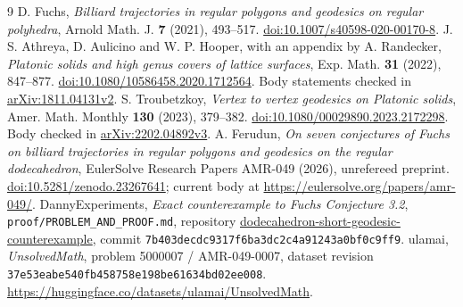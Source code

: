 \documentclass[11pt]{amsart}
\theoremstyle{remark}
\begin{document}
\begin{thebibliography}{9}
D. Fuchs, \emph{Billiard trajectories in regular polygons and geodesics on regular polyhedra},
Arnold Math. J. \textbf{7} (2021), 493--517.
\href{https://doi.org/10.1007/s40598-020-00170-8}{doi:10.1007/s40598-020-00170-8}.
J. S. Athreya, D. Aulicino and W. P. Hooper, with an appendix by A. Randecker,
\emph{Platonic solids and high genus covers of lattice surfaces},
Exp. Math. \textbf{31} (2022), 847--877.
\href{https://doi.org/10.1080/10586458.2020.1712564}{doi:10.1080/10586458.2020.1712564}.
Body statements checked in \href{https://arxiv.org/abs/1811.04131v2}{arXiv:1811.04131v2}.
S. Troubetzkoy, \emph{Vertex to vertex geodesics on Platonic solids},
Amer. Math. Monthly \textbf{130} (2023), 379--382.
\href{https://doi.org/10.1080/00029890.2023.2172298}{doi:10.1080/00029890.2023.2172298}.
Body checked in \href{https://arxiv.org/abs/2202.04892v3}{arXiv:2202.04892v3}.
A. Ferudun, \emph{On seven conjectures of Fuchs on billiard trajectories in regular polygons and geodesics on the regular dodecahedron},
EulerSolve Research Papers AMR-049 (2026), unrefereed preprint.
\href{https://doi.org/10.5281/zenodo.23267641}{doi:10.5281/zenodo.23267641};
current body at \url{https://eulersolve.org/papers/amr-049/}.
DannyExperiments, \emph{Exact counterexample to Fuchs Conjecture 3.2},
\texttt{proof/PROBLEM\_AND\_PROOF.md}, repository
\href{https://github.com/DannyExperiments/dodecahedron-short-geodesic-counterexample}{dodecahedron-short-geodesic-counterexample},
commit \texttt{7b403decdc9317f6ba3dc2c4a91243a0bf0c9ff9}.
ulamai, \emph{UnsolvedMath}, problem 5000007 / AMR-049-0007,
dataset revision \texttt{37e53eabe540fb458758e198be61634bd02ee008}.
\url{https://huggingface.co/datasets/ulamai/UnsolvedMath}.
\end{thebibliography}
\end{document}
